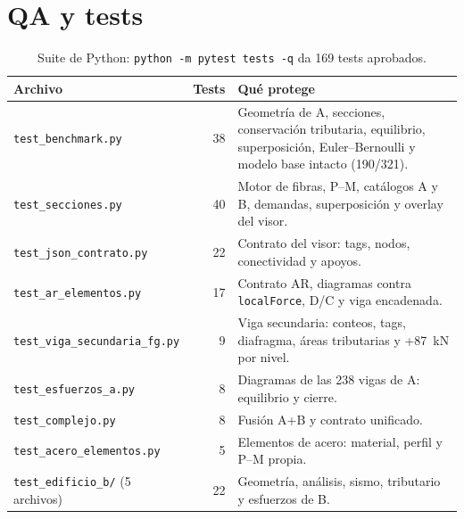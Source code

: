 \documentclass[11pt,a4paper]{article}
\begin{document}
\section{QA y tests}

\begin{table}[h]
\centering
\caption{Suite de Python: \texttt{python -m pytest tests -q} da 169 tests aprobados.}
\begin{tabularx}{\textwidth}{lrX}
\toprule
Archivo & Tests & Qué protege \\
\midrule
\texttt{test\_benchmark.py} & 38 & Geometría de A, secciones, conservación tributaria, equilibrio, superposición, Euler--Bernoulli y modelo base intacto (190/321). \\
\texttt{test\_secciones.py} & 40 & Motor de fibras, P--M, catálogos A y B, demandas, superposición y overlay del visor. \\
\texttt{test\_json\_contrato.py} & 22 & Contrato del visor: tags, nodos, conectividad y apoyos. \\
\texttt{test\_ar\_elementos.py} & 17 & Contrato AR, diagramas contra \texttt{localForce}, D/C y viga encadenada. \\
\texttt{test\_viga\_secundaria\_fg.py} & 9 & Viga secundaria: conteos, tags, diafragma, áreas tributarias y +87~kN por nivel. \\
\texttt{test\_esfuerzos\_a.py} & 8 & Diagramas de las 238 vigas de A: equilibrio y cierre. \\
\texttt{test\_complejo.py} & 8 & Fusión A+B y contrato unificado. \\
\texttt{test\_acero\_elementos.py} & 5 & Elementos de acero: material, perfil y P--M propia. \\
\texttt{test\_edificio\_b/} (5 archivos) & 22 & Geometría, análisis, sismo, tributario y esfuerzos de B. \\
\bottomrule
\end{tabularx}
\end{table}
\end{document}
